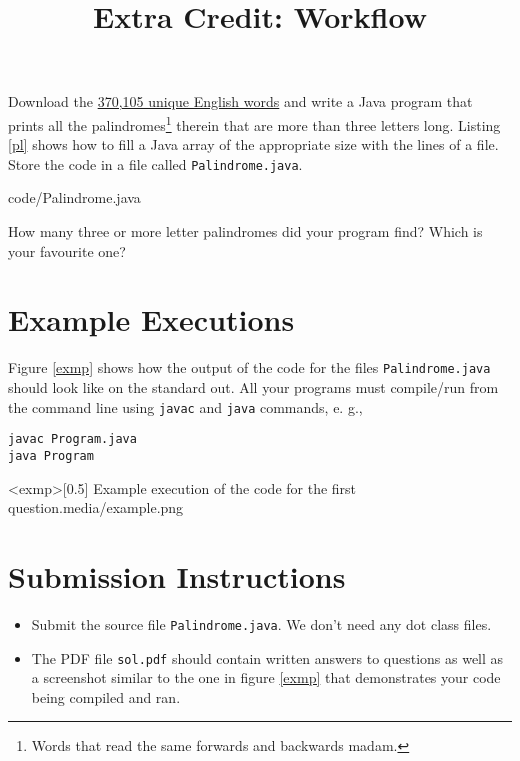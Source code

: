 \documentclass{homework}
\title{Extra Credit: Workflow}
\newcommand\callit[1]{Store the code in a file called \texttt{#1}.}
\newcommand\englishwords{%
  \href{%
    https://raw.githubusercontent.com/dwyl/english-words/master/words_alpha.txt%
  }{370,105 unique English words}%
}
\begin{document}
 \maketitle

\question Download the \englishwords{} and write a Java program that prints
all the palindromes\footnote{Words that read the same forwards and
  backwards \eg madam.} therein that are more than three letters
long. Listing \ref{pl} shows how to fill a Java array of the
appropriate size with the lines of a file.
\callit{Palindrome.java}


{code/Palindrome.java}

\question How many three or more letter palindromes did your program find?
Which is your favourite one?

\section{Example Executions}

Figure \ref{exmp} shows how the output of the code for the files
\texttt{Palindrome.java} should look like on the standard out. All
your programs must compile/run from the command line using
\texttt{javac} and \texttt{java} commands, e. g.,

\begin{verbatim}
javac Program.java
java Program
\end{verbatim}

\img<exmp>[0.5]
{Example execution of the code for the first question.}{media/example.png}

\section{Submission Instructions}

\begin{itemize}
  \item Submit the source file \texttt{Palindrome.java}. We don't need any
        dot class files.
  \item The PDF file \texttt{sol.pdf} should contain written answers to
        questions as well as a screenshot similar to the one in figure \ref{exmp}
        that demonstrates your code being compiled and ran.
\end{itemize}
\end{document}
